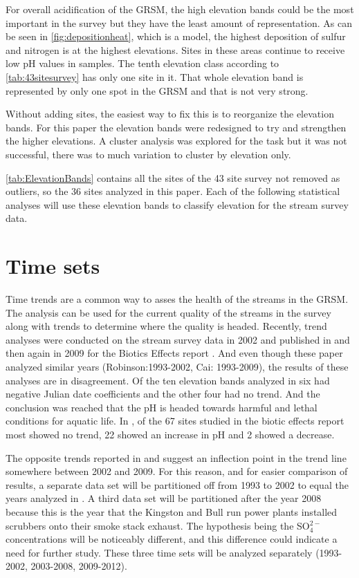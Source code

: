 For overall acidification of the GRSM, the high elevation bands could be the most important in the survey but they have the least amount of representation.
As can be seen in \autoref{fig:depositionheat}, which is a model, the highest deposition of sulfur and nitrogen is at the highest elevations.
Sites in these areas continue to receive low pH values in samples.
The tenth elevation class according to \autoref{tab:43sitesurvey} has only one site in it.
That whole elevation band is represented by only one spot in the GRSM and that is not very strong.

Without adding sites, the easiest way to fix this is to reorganize the elevation bands. 
For this paper the elevation bands were redesigned to try and strengthen the higher elevations.
A cluster analysis was explored for the task but it was not successful, there was to much variation to cluster by elevation only.



\autoref{tab:ElevationBands} contains all the sites of the 43 site survey not removed as outliers, so the 36 sites analyzed in this paper.
Each of the following statistical analyses will use these elevation bands to classify elevation for the stream survey data.

\section{Time sets}

Time trends are a common way to asses the health of the streams in the GRSM.
The analysis can be used for the current quality of the streams in the survey along with trends to determine where the quality is headed. 
Recently, trend analyses were conducted on the stream survey data in 2002 and published in \citet{robinson2008ph} and then again in 2009 for the Biotics Effects report \citep{cai2013}.
And even though these paper analyzed similar years (Robinson:1993-2002, Cai: 1993-2009), the results of these analyses are in disagreement.
Of the ten elevation bands analyzed in \citet{robinson2008ph} six had negative Julian date coefficients and the other four had no trend.
And the conclusion was reached that the pH is headed towards harmful and lethal conditions for aquatic life. 
In \citet{cai2013}, of the 67 sites studied in the biotic effects report most showed no trend, 22 showed an increase in pH and 2 showed a decrease. 

The opposite trends reported in  \citet{robinson2008ph} and \citet{cai2013} suggest an inflection point in the trend line somewhere between 2002 and 2009. 
For this reason, and for easier comparison of results,  a separate data set will be partitioned off from 1993 to 2002 to equal the years analyzed in \citet{robinson2008ph}.  
A third data set will be partitioned after the year 2008 because this is the year that the Kingston and Bull run power plants installed scrubbers onto their smoke stack exhaust. 
The hypothesis being the SO$_4^{2-}$ concentrations will be noticeably different, and this difference could indicate a need for further study. 
These three time sets will be analyzed separately (1993-2002, 2003-2008, 2009-2012).

